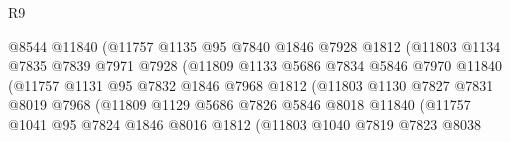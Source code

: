 \begin{lexlean}{R9}
\begin{coremodule}
                                  @8544
                                  @11840
                                  (@11757
                                    @1135
                                    @95
                                    @7840
                                    @1846
                                    @7928
                                    @1812
                                    (@11803
                                      @1134
                                      @7835
                                      @7839
                                      @7971
                                      @7928
                                      (@11809
                                        @1133
                                        @5686
                                        @7834
                                        @5846
                                        @7970
                                        @11840
                                        (@11757
                                          @1131
                                          @95
                                          @7832
                                          @1846
                                          @7968
                                          @1812
                                          (@11803
                                            @1130
                                            @7827
                                            @7831
                                            @8019
                                            @7968
                                            (@11809
                                              @1129
                                              @5686
                                              @7826
                                              @5846
                                              @8018
                                              @11840
                                              (@11757
                                                @1041
                                                @95
                                                @7824
                                                @1846
                                                @8016
                                                @1812
                                                (@11803
                                                  @1040
                                                  @7819
                                                  @7823
                                                  @8038

\end{coremodule}
\end{lexlean}
